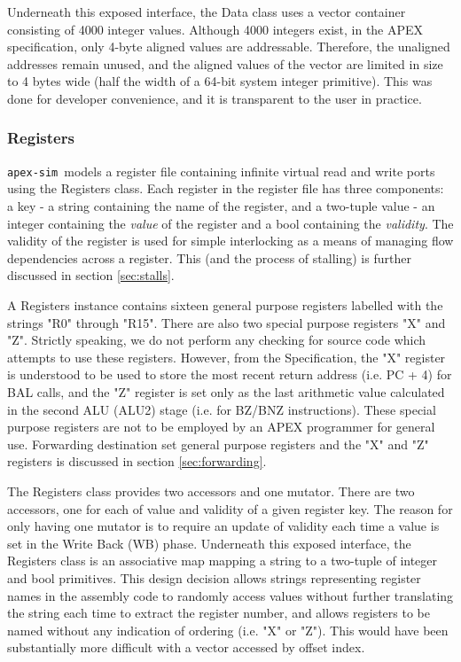\documentclass[12pt]{article}
\newcommand{\codename}[0]{\texttt{apex-sim}~}
\begin{document}
Underneath this exposed interface, the Data class uses a vector container consisting of 4000 integer values.
Although 4000 integers exist, in the APEX specification, only 4-byte aligned values are addressable.
Therefore, the unaligned addresses remain unused, and the aligned values of the vector are limited in size to 4 bytes wide (half the width of a 64-bit system integer primitive). This was done for developer convenience, and it is transparent to the user in practice.

\subsubsection{Registers}
\codename models a register file containing infinite virtual read and write ports using the Registers class.
Each register in the register file has three components: a key \-- a string containing the name of the register, and a two-tuple value \-- an integer containing the \textit{value} of the register and a bool containing the \textit{validity}.
The validity of the register is used for simple interlocking as a means of managing flow dependencies across a register.
This (and the process of stalling) is further discussed in section \ref{sec:stalls}.

A Registers instance contains sixteen general purpose registers labelled with the strings "R0" through "R15".
There are also two special purpose registers "X" and "Z".
Strictly speaking, we do not perform any checking for source code which attempts to use these registers.
However, from the Specification, the "X" register is understood to be used to store the most recent return address (i.e. PC + 4) for BAL calls, and the "Z" register is set only as the last arithmetic value calculated in the second ALU (ALU2) stage (i.e. for BZ/BNZ instructions).
These special purpose registers are not to be employed by an APEX programmer for general use.
Forwarding destination set general purpose registers and the "X" and "Z" registers is discussed in section \ref{sec:forwarding}.

The Registers class provides two accessors and one mutator. There are two accessors, one for each of value and validity of a given register key.
The reason for only having one mutator is to require an update of validity each time a value is set in the Write Back (WB) phase.
Underneath this exposed interface, the Registers class is an associative map mapping a string to a two-tuple of integer and bool primitives.
This design decision allows strings representing register names in the assembly code to randomly access values without further translating the string each time to extract the register number, and allows registers to be named without any indication of ordering (i.e. "X" or "Z").
This would have been substantially more difficult with a vector accessed by offset index.
\end{document}
